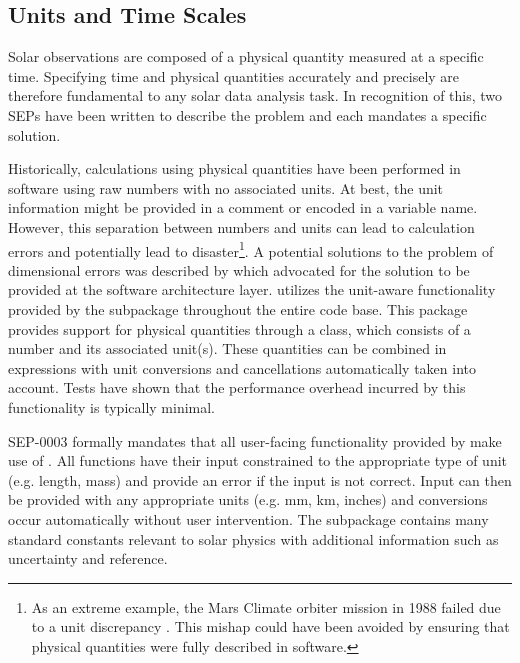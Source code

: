 \subsection{Units and Time Scales}
\label{sec:units}

Solar observations are composed of a physical quantity measured at a specific time.
Specifying time and physical quantities accurately and precisely are therefore fundamental to any solar data analysis task.
In recognition of this, two SEPs have been written to describe the problem and each mandates a specific solution.

Historically, calculations using physical quantities have been performed in software using raw numbers with no associated units.
At best, the unit information might be provided in a comment or encoded in a variable name.
However, this separation between numbers and units can lead to calculation errors and potentially lead to disaster\footnote{As an extreme example, the Mars Climate orbiter mission in 1988 failed due to a unit discrepancy \citep{mco_mishap_report}.
This mishap could have been avoided by ensuring that physical quantities were fully described in software.}.
A potential solutions to the problem of dimensional errors was described by \citet{Damevski2009} which advocated for the solution to be provided at the software architecture layer.
\sunpypkg utilizes the unit-aware functionality provided by the  subpackage throughout the entire code base.
This package provides support for physical quantities through a  class, which consists of a number and its associated unit(s).
These quantities can be combined in expressions with unit conversions and cancellations automatically taken into account.
Tests have shown that the performance overhead incurred by this functionality is typically minimal.

SEP-0003 \citep{sep-0003} formally mandates that all user-facing functionality provided by \sunpypkg make use of .
All functions have their input constrained to the appropriate type of unit (e.g. length, mass) and provide an error if the input is not correct.
Input can then be provided with any appropriate units (e.g. mm, km, inches) and conversions occur automatically without user intervention.
The  subpackage contains many standard constants relevant to solar physics with additional information such as uncertainty and reference.

